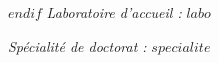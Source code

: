 \documentclass[12pt,twoside]{reedthesis}
\begin{document}
\begin{center}
\vspace*{0.2cm}
$endif$
{\small \it Laboratoire d'accueil : }
$labo$
\vspace*{0.2cm}
\end{center}




\begin{center}
{\it Spécialité de doctorat : }
{\large $specialite$}
\end{center}
\end{document}
